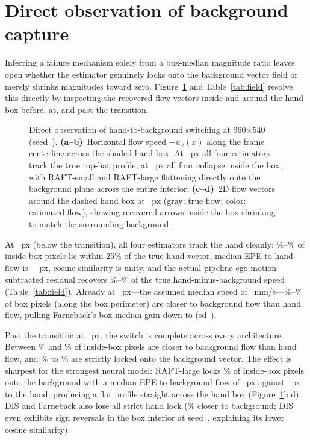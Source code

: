 \documentclass[11pt]{article}
\begin{document}
\section{Direct observation of background capture}
\label{sec:field}

Inferring a failure mechanism solely from a box-median magnitude ratio leaves open whether the
estimator genuinely locks onto the background vector field or merely shrinks magnitudes toward
zero. Figure~\ref{fig:flowfield} and Table~\ref{tab:field} resolve this directly by inspecting the
recovered flow vectors inside and around the hand box before, at, and past the transition.

\begin{figure}[t]
\centering

\caption{Direct observation of hand-to-background switching at 960$\times$540 (seed~\cgPubSeed{}).
\textbf{(a--b)}~Horizontal flow speed $-u_x(x)$ along the frame centerline across the shaded hand
box. At \cgDispPreKnee{}~px all four estimators track the true top-hat profile; at
\cgDispShelfProbe{}~px all four collapse inside the box, with RAFT-small and RAFT-large flattening
directly onto the background plane across the entire interior. \textbf{(c--d)}~2D flow vectors
around the dashed hand box at \cgDispShelfProbe{}~px (gray: true flow; color: estimated flow),
showing recovered arrows inside the box shrinking to match the surrounding background.}
\label{fig:flowfield}
\end{figure}

At \cgDispPreKnee{}~px (below the transition), all four estimators track the hand cleanly:
\cgFieldLockedHandPreMin{}\%--\cgFieldLockedHandPreMax{}\% of inside-box pixels lie within 25\% of
the true hand vector, median EPE to hand flow is \cgFieldPreEpeMin{}--\cgFieldPreEpeMax{}~px,
cosine similarity is unity, and the actual pipeline ego-motion-subtracted residual recovers
\cgFieldPreRecMinPct{}\%--\cgFieldPreRecMaxPct{}\% of the true hand-minus-background speed
(Table~\ref{tab:field}). Already at \cgDispKnee{}~px---the assumed median speed of
\cgSpeedAtKnee{}~mm/s---\cgFieldKneeCloserMin{}\%--\cgFieldKneeCloserMax{}\% of box pixels (along
the box perimeter) are closer to background flow than hand flow, pulling Farneback's box-median
gain down to \cgGainAtKneeMean{} (sd~\cgGainAtKneeSd{}).

Past the transition at \cgDispShelfProbe{}~px, the switch is complete across every architecture.
Between \cgFieldCloserBgMin{}\% and \cgFieldCloserBgMax{}\% of inside-box pixels are closer to
background flow than hand flow, and \cgFieldLockedBgMin{}\% to \cgFieldLockedBgMax{}\% are strictly
locked onto the background vector. The effect is sharpest for the strongest neural model:
RAFT-large locks \cgFieldRaftLLockedBg{}\% of inside-box pixels onto the background with a median
EPE to background flow of \cgFieldRaftLEpeBg{}~px against \cgFieldRaftLEpeHand{}~px to the hand,
producing a flat profile straight across the hand box (Figure~\ref{fig:flowfield}b,d). DIS and
Farneback also lose all strict hand lock (\cgFieldFarCloserBg{}\% closer to background;
DIS even exhibits sign reversals in the box interior at seed~\cgPubSeed{}, explaining its lower
cosine similarity).
\end{document}
